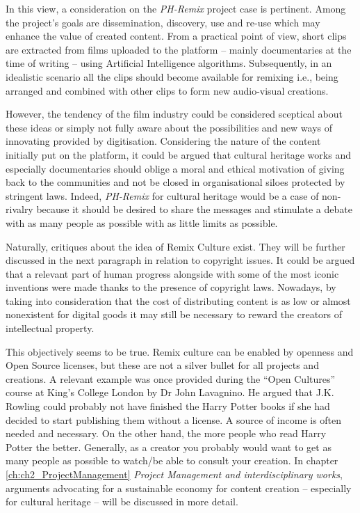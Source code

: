 In this view, a consideration on the \emph{PH-Remix} project case is pertinent. Among the project’s goals are dissemination, discovery, use and re-use which may enhance the value of created content. From a practical point of view, short clips are extracted from films uploaded to the platform – mainly documentaries at the time of writing – using Artificial Intelligence algorithms. Subsequently, in an idealistic scenario all the clips should become available for remixing i.e., being arranged and combined with other clips to form new audio-visual creations.

However, the tendency of the film industry could be considered sceptical about these ideas or simply not fully aware about the possibilities and new ways of innovating provided by digitisation. Considering the nature of the content initially put on the platform, it could be argued that cultural heritage works and especially documentaries should oblige a moral and ethical motivation of giving back to the communities and not be closed in organisational siloes protected by stringent laws. Indeed, \emph{PH-Remix} for cultural heritage would be a case of non-rivalry because it should be desired to share the messages and stimulate a debate with as many people as possible with as little limits as possible.

Naturally, critiques about the idea of Remix Culture exist. They will be further discussed in the next paragraph in relation to copyright issues. It could be argued that a relevant part of human progress alongside with some of the most iconic inventions were made thanks to the presence of copyright laws. Nowadays, by taking into consideration that the cost of distributing content is as low or almost nonexistent for digital goods it may still be necessary to reward the creators of intellectual property.

This objectively seems to be true. Remix culture can be enabled by openness and Open Source licenses, but these are not a silver bullet for all projects and creations. A relevant example was once provided during the “Open Cultures” course at King’s College London by Dr John Lavagnino. He argued that J.K. Rowling could probably not have finished the Harry Potter books if she had decided to start publishing them without a license. A source of income is often needed and necessary. On the other hand, the more people who read Harry Potter the better. Generally, as a creator you probably would want to get as many people as possible to watch/be able to consult your creation. In chapter \ref{ch:ch2_ProjectManagement} \emph{Project Management and interdisciplinary works}, arguments advocating for a sustainable economy for content creation – especially for cultural heritage – will be discussed in more detail. 

